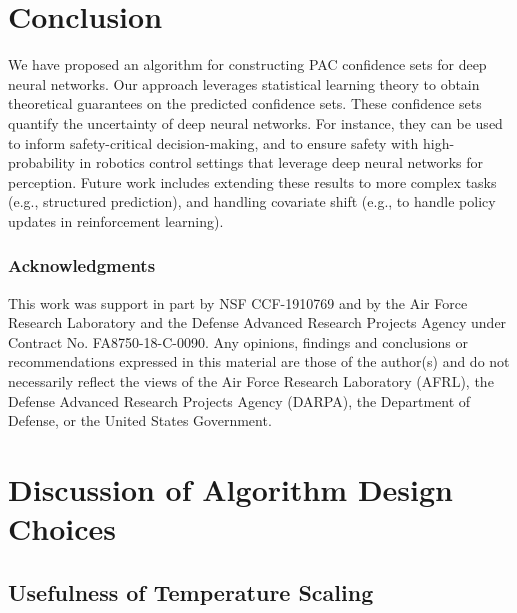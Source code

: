 \documentclass{article} \usepackage{iclr2020_conference,times}
\renewcommand{\(}						{\left(}
\renewcommand{\)}						{\right)}
\renewcommand{\[}						{\left[}
\renewcommand{\]}						{\right]}
\newcommand{\<}						{\left<}
\renewcommand{\>}						{\right>}
\begin{document}
\section{Conclusion}
We have proposed an algorithm for constructing PAC confidence sets for deep neural networks. Our approach leverages statistical learning theory to obtain theoretical guarantees on the predicted confidence sets. These confidence sets quantify the uncertainty of deep neural networks. For instance, they can be used to inform safety-critical decision-making, and to ensure safety with high-probability in robotics control settings that leverage deep neural networks for perception. Future work includes extending these results to more complex tasks (e.g., structured prediction), and handling covariate shift (e.g., to handle policy updates in reinforcement learning). 
\subsubsection*{Acknowledgments}
This work was support in part by NSF CCF-1910769 and by the Air Force Research Laboratory and the Defense Advanced Research Projects Agency under Contract No. FA8750-18-C-0090.  Any opinions, findings and conclusions or recommendations expressed in this material are those of the author(s) and do not necessarily reflect the views of the Air Force Research Laboratory (AFRL), the Defense Advanced Research Projects Agency (DARPA), the Department of Defense, or the United States Government.




\clearpage


\appendix

\section{Discussion of Algorithm Design Choices}

\subsection{Usefulness of Temperature Scaling}
\label{sec:appendixtemperature}
\end{document}
